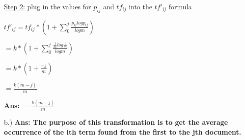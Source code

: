 \documentclass[11pt]{article}
\begin{document}
\vspace{25mm}
\underline{Step 2:} plug in the values for $p_{ij}$ and $tf_{ij}$ into the $tf'_{ij}$ formula
 
 $tf'_{ij} = tf_{ij} * (1+ \sum_0^j \frac{p_{ij}logp_{ij}}{logm})$
 
 \qquad $ = k * (1 + \sum_0^j \frac{\frac{1}{m}log\frac{1}{m}}{logm})$
 
 \qquad $ = k * (1 + \frac{-j}{m})$
 
 \qquad $= \frac{k(m-j)}{m}$
 
 \vspace{5mm}
 \textbf{Ans:} $= \frac{k(m-j)}{m}$
 
 \vspace{15mm}
 b.)
\textbf{Ans: The purpose of this transformation is to get the average occurrence of the ith term found from the first to the jth document.}
\end{document}
